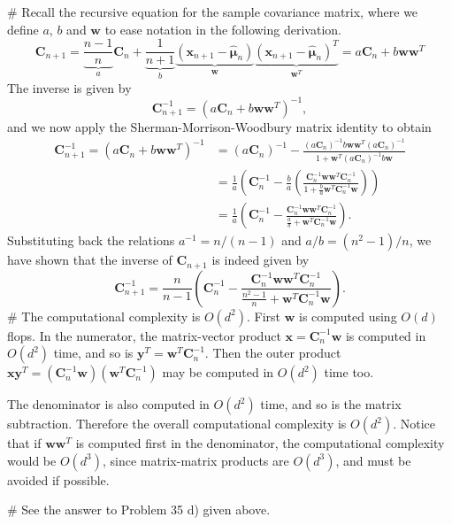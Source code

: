 \documentclass[12pt, a4paper]{article}
\newcommand{\vect}[1]{\bm{#1}}
\begin{document}
\begin{easylist}[enumerate]
# Recall the recursive equation for the sample covariance matrix, where we define $a$, $b$ and $\vect{w}$ to ease notation in the following derivation.
\begin{equation*}
	\vect{C}_{n+1} = \underbrace{\frac{n-1}{n}}_{a} \vect{C}_n + \underbrace{\frac{1}{n+1}}_b
	\underbrace{\left( \vect{x}_{n+1} - \hat{\vect{\mu}}_n \right)}_{\vect{w}}
	\underbrace{\left( \vect{x}_{n+1} - \hat{\vect{\mu}}_n \right)^T}_{\vect{w}^T}
	= a \vect{C}_n + b \vect{w} \vect{w}^T
\end{equation*}
The inverse is given by
\begin{equation*}
	\vect{C}_{n+1}^{-1} = \left( a \vect{C}_n + b \vect{w} \vect{w}^T \right)^{-1},
\end{equation*}
and we now apply the Sherman-Morrison-Woodbury matrix identity to obtain
\begin{align*}
	\vect{C}_{n+1}^{-1} = \left( a \vect{C}_n + b \vect{w} \vect{w}^T \right)^{-1} & = \left( a \vect{C}_n \right)^{-1} - \frac{\left( a \vect{C}_n \right)^{-1} b \vect{w} \vect{w}^T \left( a \vect{C}_n \right)^{-1}}{1 + \vect{w}^T \left( a \vect{C}_n \right)^{-1} b \vect{w}} \\
	&= \frac{1}{a}\left( \vect{C}_n^{-1} - \frac{b}{a} \left( \frac{ \vect{C}_n^{-1} \vect{w} \vect{w}^T \vect{C}_n^{-1}}{1 + \frac{b}{a} \vect{w}^T \vect{C}_n^{-1} \vect{w}} \right) \right) \\
	&= \frac{1}{a}\left( \vect{C}_n^{-1} - 
	\frac{ \vect{C}_n^{-1} \vect{w} \vect{w}^T \vect{C}_n^{-1}}{\frac{a}{b} + \vect{w}^T \vect{C}_n^{-1} \vect{w}}  \right).
\end{align*}
Substituting back the relations $a^{-1} = n / (n-1)$ and $a /b = (n^2 - 1) / n$, we have shown that the inverse of $\vect{C}_{n+1}$ is indeed given by
\begin{equation*}
	\vect{C}_{n+1}^{-1} =
	\frac{n}{n-1}\left( \vect{C}_n^{-1} - 
	\frac{ \vect{C}_n^{-1} \vect{w} \vect{w}^T \vect{C}_n^{-1}}{\frac{n^2-1}{n} + \vect{w}^T \vect{C}_n^{-1} \vect{w}}  \right).
\end{equation*}
# The computational complexity is $O(d^2)$.
First $\vect{w}$ is computed using $O(d)$ flops.
In the numerator, the matrix-vector product $\vect{x} = \vect{C}_n^{-1} \vect{w}$ is computed in $O(d^2)$ time, and so is $\vect{y}^T = \vect{w}^T \vect{C}_n^{-1}$.
Then the outer product $\vect{x}\vect{y}^T =  \left( \vect{C}_n^{-1} \vect{w} \right) \left( \vect{w}^T \vect{C}_n^{-1} \right)$ may be computed in $O(d^2)$ time too.

The denominator is also computed in $O(d^2)$ time, and so is the matrix subtraction.
Therefore the overall computational complexity is $O(d^2)$.
Notice that if $\vect{w} \vect{w}^T$ is computed first in the denominator, the computational complexity would be $O(d^3)$, since matrix-matrix products are $O(d^3)$, and must be avoided if possible.

# See the answer to Problem 35 d) given above.
\end{easylist}
\end{document}
